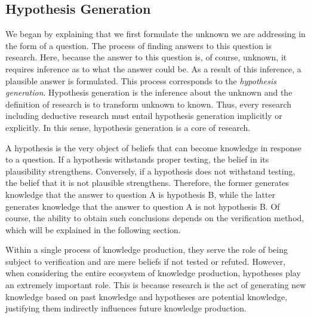 \documentclass{book}
\begin{document}
\subsection{Hypothesis Generation}
We began by explaining that we first formulate the unknown we are addressing in the form of a question. The process of finding answers to this question is research. Here, because the answer to this question is, of course, unknown, it requires inference as to what the answer could be. As a result of this inference, a plausible answer is formulated. This process corresponds to the \textit{hypothesis generation}. Hypothesis generation is the inference about the unknown and the definition of research is to transform unknown to known. Thus, every research including deductive research must entail hypothesis generation implicitly or explicitly. In this sense, hypothesis generation is a core of research.

A hypothesis is the very object of beliefs that can become knowledge in response to a question. If a hypothesis withstands proper testing, the belief in its plausibility strengthens. Conversely, if a hypothesis does not withstand testing, the belief that it is not plausible strengthens. Therefore, the former generates knowledge that the answer to question A is hypothesis B, while the latter generates knowledge that the answer to question A is not hypothesis B. Of course, the ability to obtain such conclusions depends on the verification method, which will be explained in the following section.

Within a single process of knowledge production, they serve the role of being subject to verification and are mere beliefs if not tested or refuted. However, when considering the entire ecosystem of knowledge production, hypotheses play an extremely important role. This is because research is the act of generating new knowledge based on past knowledge and hypotheses are potential knowledge, justifying them indirectly influences future knowledge production.

\end{document}
